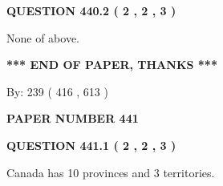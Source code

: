 \documentclass[12pt]{article}
\begin{document}
 
  
\vspace{0.2in}
  
{\textbf{\Large{QUESTION
440.2 
 ( 2 , 2 , 3 )
}}}
  
  
 
 
\noindent{}
 
 
 None of above.
 
 
 
 
   
   
 \vspace{0.2in}
 
   
   
   
   
\vspace{1.0in} 
{\textbf{\large{ *** END OF PAPER, THANKS *** }}} 
   
   
\hspace{1.0in} By: 
 239 ( 416 ,  613 )
   
   
   
   
\newpage 
\setcounter{page}{ 
   441001 } 
   
   
   
   
 {\textbf{ \Large{ PAPER NUMBER  441  }}}
   
   
\vspace{0.2in}
   
   
   
   
   
   
 \vspace{0.2in}
 
 
 
 
   
   
  
\vspace{0.2in}
  
{\textbf{\Large{QUESTION
441.1 
 ( 2 , 2 , 3 )
}}}
  
  
 
 
\noindent{}
 
 
Canada has 10  provinces and 3 territories.
 
 
 
 
  
\vspace{0.2in}
  
\end{document}
